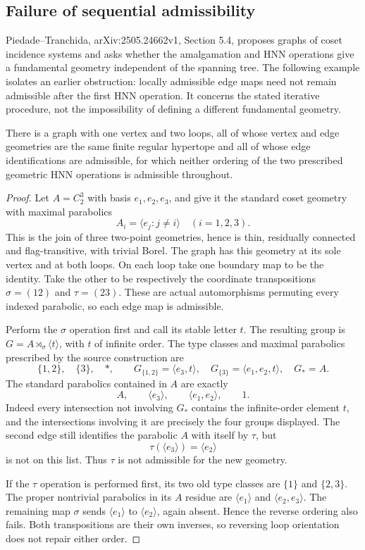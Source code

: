 \subsection{Failure of sequential admissibility}
Piedade--Tranchida, arXiv:2505.24662v1, Section 5.4, proposes graphs of
coset incidence systems and asks whether the amalgamation and HNN
operations give a fundamental geometry independent of the spanning tree.
The following example isolates an earlier obstruction: locally admissible
edge maps need not remain admissible after the first HNN operation.
It concerns the stated iterative procedure, not the impossibility of
defining a different fundamental geometry.

\begin{proposition}
There is a graph with one vertex and two loops, all of whose vertex and
edge geometries are the same finite regular hypertope and all of whose
edge identifications are admissible, for which neither ordering of the
two prescribed geometric HNN operations is admissible throughout.
\end{proposition}
\begin{proof}
Let $A=C_2^3$ with basis $e_1,e_2,e_3$, and give it the standard coset
geometry with maximal parabolics
\[
 A_i=\langle e_j:j\ne i\rangle\quad(i=1,2,3).
\]
This is the join of three two-point geometries, hence is thin,
residually connected and flag-transitive, with trivial Borel.
The graph has this geometry at its sole vertex and at both loops.
On each loop take one boundary map to be the identity. Take the other
to be respectively the coordinate transpositions
$\sigma=(12)$ and $\tau=(23)$. These are actual automorphisms
permuting every indexed parabolic, so each edge map is admissible.

Perform the $\sigma$ operation first and call its stable letter $t$.
The resulting group is $G=A\rtimes_\sigma\langle t\rangle$, with
$t$ of infinite order. The type classes and maximal parabolics prescribed
by the source construction are
\[
 \{1,2\},\quad\{3\},\quad *,\qquad
 G_{\{1,2\}}=\langle e_3,t\rangle,
 \quad G_{\{3\}}=\langle e_1,e_2,t\rangle,
 \quad G_*=A.
\]
The standard parabolics contained in $A$ are exactly
\[
 A,\qquad \langle e_3\rangle,\qquad
 \langle e_1,e_2\rangle,\qquad 1.
\]
Indeed every intersection not involving $G_*$ contains the infinite-order
element $t$, and the intersections involving it are precisely the four
groups displayed. The second edge still identifies the parabolic $A$
with itself by $\tau$, but
\[
 \tau(\langle e_3\rangle)=\langle e_2\rangle
\]
is not on this list. Thus $\tau$ is not admissible for the new geometry.

If the $\tau$ operation is performed first, its two old type classes
are $\{1\}$ and $\{2,3\}$. The proper nontrivial parabolics in its
$A$ residue are $\langle e_1\rangle$ and $\langle e_2,e_3\rangle$.
The remaining map $\sigma$ sends $\langle e_1\rangle$ to
$\langle e_2\rangle$, again absent. Hence the reverse ordering also
fails. Both transpositions are their own inverses, so reversing loop
orientation does not repair either order.
\end{proof}

